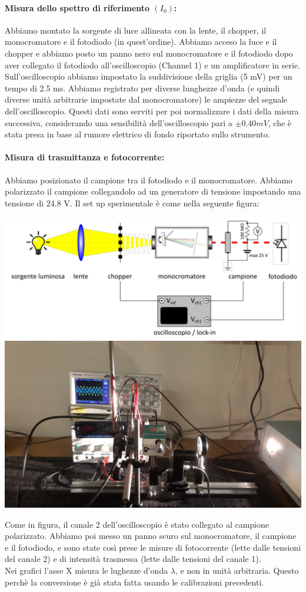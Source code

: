 \documentclass{article}
\begin{document}
\paragraph{Misura dello spettro di riferimento $(I_0)$:}
Abbiamo montato la sorgente di luce allineata con la lente, il chopper, il monocromatore e il fotodiodo (in quest'ordine). Abbiamo acceso la luce e il chopper e abbiamo posto un panno nero sul monocromatore e il fotodiodo dopo aver collegato il fotodiodo all'oscilloscopio (Channel 1) e un amplificatore in serie. Sull'oscilloscopio abbiamo impostato la suddivisione della griglia (5 mV) per un tempo di 2.5 ms. Abbiamo registrato per diverse lunghezze d'onda (e quindi diverse unità arbitrarie impostate dal monocromatore) le ampiezze del segnale dell'oscilloscopio. 
Questi dati sono serviti per poi normalizzare i dati della misura successiva, considerando una sensibilità dell'oscilloscopio pari a $\pm0.40 mV$, che è stata presa in base al rumore elettrico di fondo riportato sullo strumento.  
\paragraph{Misura di trasmittanza e fotocorrente:}
Abbiamo posizionato il campione tra il fotodiodo e il monocromatore. Abbiamo polarizzato il campione collegandolo ad un generatore di tensione impostando una tensione di 24.8 V. Il set up sperimentale è come nella seguente figura:

\begin{center}
    \includegraphics[width=.45\textwidth]{../images/circuito4.png}
    \hfill
    \includegraphics[width=.45\textwidth]{../images/circuito5.png}
    \label{fig:led_circuito}
\end{center}

Come in figura, il canale 2 dell'oscilloscopio è stato collegato al campione polarizzato. Abbiamo poi messo un panno scuro sul monocromatore, il campione e il fotodiodo, e sono state così prese le misure di fotocorrente (lette dalle tensioni del canale 2) e di intensità trasmessa (lette dalle tensioni del canale 1).   
\\
Nei grafici l'asse X misura le lughezze d'onda $\lambda$, e non in unità arbitraria. Questo perchè la conversione è già stata fatta usando le calibrazioni precedenti.
\end{document}
